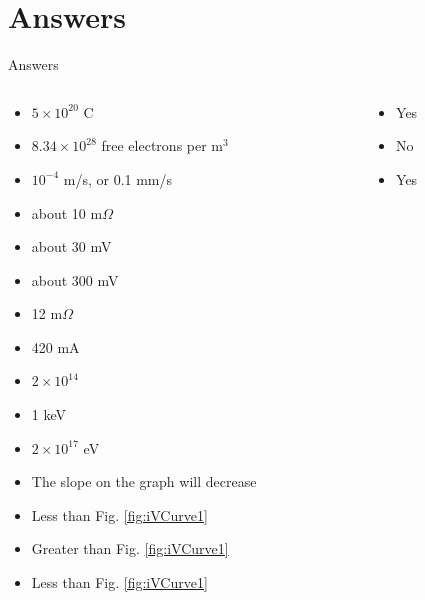 \documentclass{beamer}
\begin{document}
\section{Answers}

\begin{frame}{Answers}
\tiny
\begin{columns}[T]
\begin{column}{0.5\textwidth}
\begin{itemize}
\item $5 \times 10^{20}$ C
\item $8.34 \times 10^{28}$ free electrons per m$^3$
\item $10^{-4}$ m/s, or 0.1 mm/s
\item about 10 m$\Omega$
\item about 30 mV
\item about 300 mV
\item 12 m$\Omega$
\item 420 mA
\item $2 \times 10^{14}$
\item 1 keV
\item $2 \times 10^{17}$ eV
\item The slope on the graph will decrease
\item Less than Fig. \ref{fig:iVCurve1}
\item Greater than Fig. \ref{fig:iVCurve1}
\item Less than Fig. \ref{fig:iVCurve1}
\end{itemize}
\end{column}
\begin{column}{0.5\textwidth}
\begin{itemize}
\item Yes
\item No
\item Yes
\end{itemize}
\end{column}
\end{columns}
\end{frame}
\end{document}
